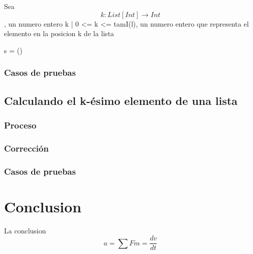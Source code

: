 \documentclass[12pt, a4paper]{article}
\begin{document}
Sea $$k: List[Int] \rightarrow Int$$, un numero entero k | 0 <= k <= tamI(l), un numero entero que representa el elemento en la posicion k de la lista


s = ()

\subsubsection{Casos de pruebas}
\subsection{Calculando el k-ésimo elemento de una lista}
\subsubsection{Proceso}
\subsubsection{Corrección}
\subsubsection{Casos de pruebas}
\section{Conclusion}
La conclusion
\newpage{}
\begin{displaymath}
 a = \sum F \dot m = \frac{dv}{dt}
\end{displaymath}
\end{document}
